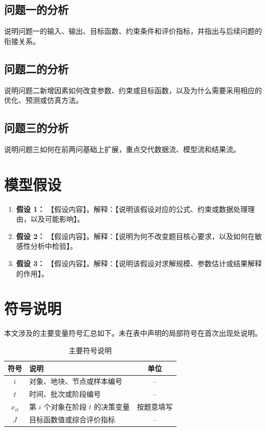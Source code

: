 \documentclass[withoutpreface,bwprint]{cumcmthesis}
\begin{document}
\subsection{问题一的分析}
说明问题一的输入、输出、目标函数、约束条件和评价指标，并指出与后续问题的衔接关系。

\subsection{问题二的分析}
说明问题二新增因素如何改变参数、约束或目标函数，以及为什么需要采用相应的优化、预测或仿真方法。

\subsection{问题三的分析}
说明问题三如何在前两问基础上扩展，重点交代数据流、模型流和结果流。


\section{模型假设}
\begin{enumerate}
  \item \textbf{假设 1：} 【假设内容】。解释：【说明该假设对应的公式、约束或数据处理理由，以及可能影响】。
  \item \textbf{假设 2：} 【假设内容】。解释：【说明为何不改变题目核心要求，以及如何在敏感性分析中检验】。
  \item \textbf{假设 3：} 【假设内容】。解释：【说明该假设对求解规模、参数估计或结果解释的作用】。
\end{enumerate}

\section{符号说明}
本文涉及的主要变量符号汇总如下。未在表中声明的局部符号在首次出现处说明。
\begin{table}[H]
  \centering
  \caption{主要符号说明}
  \label{tab:symbols}
  \begin{tabularx}{\textwidth}{cXc}
    \toprule
    符号 & 说明 & 单位 \\
    \midrule
    $i$ & 对象、地块、节点或样本编号 & -- \\
    $t$ & 时间、批次或阶段编号 & -- \\
    $x_{it}$ & 第 $i$ 个对象在阶段 $t$ 的决策变量 & 按题意填写 \\
    $J$ & 目标函数值或综合评价指标 & -- \\
    \bottomrule
  \end{tabularx}
\end{table}
\end{document}
